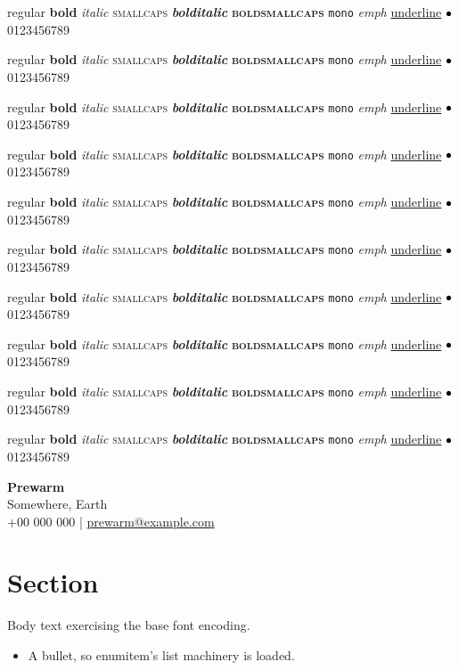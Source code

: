 \documentclass[11pt,a4paper]{article}
\newcommand{\shapesweep}{%
  regular \textbf{bold} \textit{italic} \textsc{smallcaps} \textbf{\textit{bolditalic}}
  \textbf{\textsc{boldsmallcaps}} \texttt{mono} \emph{emph} \underline{underline}
  $\vcenter{\hbox{$\bullet$}}$ 0123456789\par}
\begin{document}
{\tiny\shapesweep}
{\scriptsize\shapesweep}
{\footnotesize\shapesweep}
{\small\shapesweep}
{\normalsize\shapesweep}
{\large\shapesweep}
{\Large\shapesweep}
{\LARGE\shapesweep}
{\huge\shapesweep}
{\Huge\shapesweep}

\begin{minipage}[t]{0.98\textwidth}
{\Huge \textbf{Prewarm}}\\[4pt]
Somewhere, Earth\\[2pt]
+00 000 000 \quad | \quad \href{mailto:prewarm@example.com}{prewarm@example.com}
\end{minipage}

\section{Section}

Body text exercising the base font encoding.

\begin{itemize}[leftmargin=*, itemsep=2pt, topsep=2pt]
  \item A bullet, so enumitem's list machinery is loaded.
\end{itemize}
\end{document}
